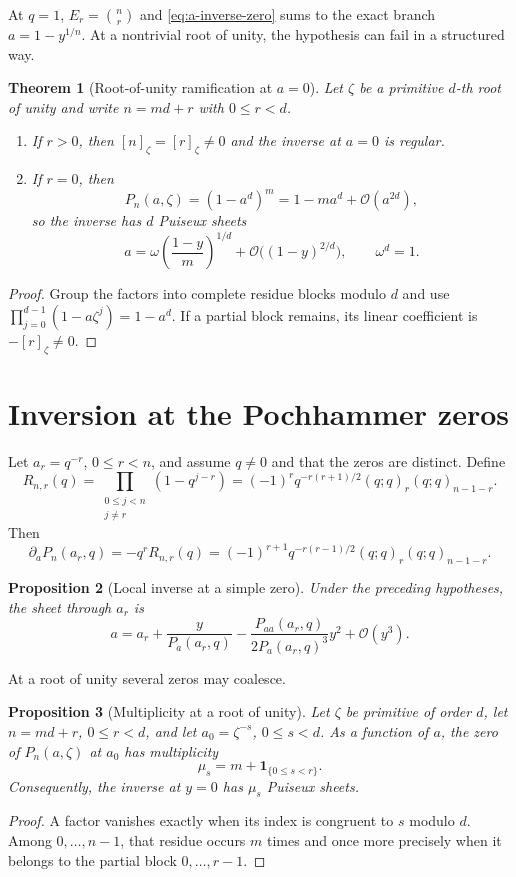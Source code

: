 \documentclass[11pt,oneside]{book}
\newtheorem{theorem}{Theorem}[chapter]
\newtheorem{proposition}[theorem]{Proposition}
\theoremstyle{definition}
\theoremstyle{remark}
\newcommand{\OO}{\mathcal{O}}
\begin{document}
At $q=1$, $E_r=\binom nr$ and \eqref{eq:a-inverse-zero} sums to the exact
branch $a=1-y^{1/n}$.  At a nontrivial root of unity, the hypothesis can fail
in a structured way.

\begin{theorem}[Root-of-unity ramification at $a=0$]\label{thm:a-zero-root-unity}
Let $\zeta$ be a primitive $d$-th root of unity and write $n=md+r$ with
$0\le r<d$.
\begin{enumerate}
\item If $r>0$, then $[n]_\zeta=[r]_\zeta\ne0$ and the inverse at $a=0$
      is regular.
\item If $r=0$, then
\[
 P_n(a,\zeta)=(1-a^d)^m=1-ma^d+\OO(a^{2d}),
\]
so the inverse has $d$ Puiseux sheets
\[
 a=\omega\left(\frac{1-y}{m}\right)^{1/d}
 +\OO\bigl((1-y)^{2/d}\bigr),\qquad \omega^d=1.
\]
\end{enumerate}
\end{theorem}
\begin{proof}
Group the factors into complete residue blocks modulo $d$ and use
$\prod_{j=0}^{d-1}(1-a\zeta^j)=1-a^d$.  If a partial block remains, its
linear coefficient is $-[r]_\zeta\ne0$.
\end{proof}

\section{Inversion at the Pochhammer zeros}
Let $a_r=q^{-r}$, $0\le r<n$, and assume $q\ne0$ and that the zeros are
distinct.  Define
\[
 R_{n,r}(q)=\prod_{\substack{0\le j<n\\j\ne r}}(1-q^{j-r})
 =(-1)^rq^{-r(r+1)/2}(q;q)_r(q;q)_{n-1-r}.
\]
Then
\begin{equation}\label{eq:poch-a-derivative-root}
 \partial_aP_n(a_r,q)
 =-q^rR_{n,r}(q)
 =(-1)^{r+1}q^{-r(r-1)/2}(q;q)_r(q;q)_{n-1-r}.
\end{equation}

\begin{proposition}[Local inverse at a simple zero]
Under the preceding hypotheses, the sheet through $a_r$ is
\[
 a=a_r+\frac{y}{P_a(a_r,q)}
 -\frac{P_{aa}(a_r,q)}{2P_a(a_r,q)^3}y^2+\OO(y^3).
\]
\end{proposition}

At a root of unity several zeros may coalesce.

\begin{proposition}[Multiplicity at a root of unity]\label{prop:root-unity-a-mult}
Let $\zeta$ be primitive of order $d$, let $n=md+r$, $0\le r<d$, and let
$a_0=\zeta^{-s}$, $0\le s<d$.  As a function of $a$, the zero of
$P_n(a,\zeta)$ at $a_0$ has multiplicity
\[
 \mu_s=m+\mathbf 1_{\{0\le s<r\}}.
\]
Consequently, the inverse at $y=0$ has $\mu_s$ Puiseux sheets.
\end{proposition}
\begin{proof}
A factor vanishes exactly when its index is congruent to $s$ modulo $d$.
Among $0,\ldots,n-1$, that residue occurs $m$ times and once more precisely
when it belongs to the partial block $0,\ldots,r-1$.
\end{proof}
\end{document}
